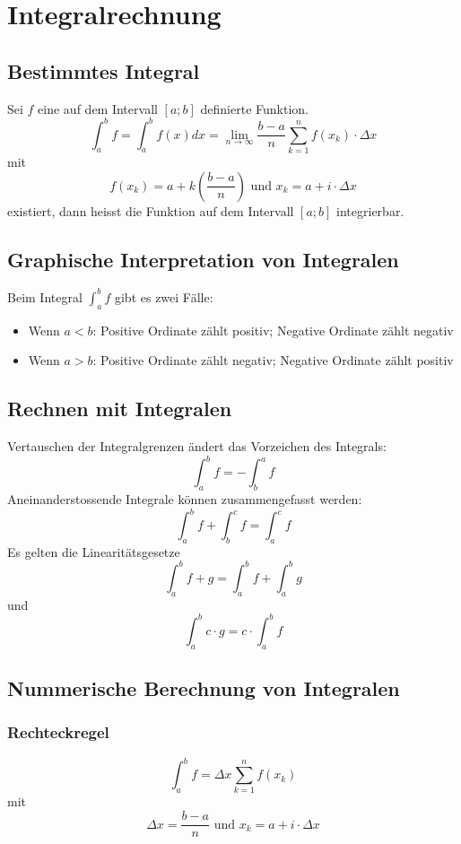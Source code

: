 \section{Integralrechnung}
\subsection{Bestimmtes Integral}
Sei $f$ eine auf dem Intervall $[a;b]$ definierte Funktion.
\[ \int^b_a f = \int^b _a f(x) dx =
  \lim_{n \to \infty} \frac{b-a}{n} \sum_{k=1}^{n}f(x_k) \cdot \Delta x
\]
mit
\[ f(x_k) = a + k\left(\frac{b-a}{n}\right) \text{ und }
  x_k = a + i \cdot \Delta x\]
existiert, dann heisst die Funktion auf dem Intervall $[a;b]$
integrierbar.

\subsection{Graphische Interpretation von Integralen}
Beim Integral $\int_{a}^{b}f$ gibt es zwei Fälle:
\begin{itemize}
  \item Wenn $a < b$: Positive Ordinate zählt positiv;
    Negative Ordinate zählt negativ
  \item Wenn $a > b$: Positive Ordinate zählt negativ;
    Negative Ordinate zählt positiv
\end{itemize}

\subsection{Rechnen mit Integralen}
Vertauschen der Integralgrenzen ändert das Vorzeichen des Integrals:
\[ \int_{a}^{b}f = - \int_{b}^{a}f \]
Aneinanderstossende Integrale können zusammengefasst werden:
\[ \int_{a}^{b}f + \int_{b}^{c}f = \int_{a}^{c}f \]
Es gelten die Linearitätsgesetze
\[ \int_{a}^{b}f+g = \int_{a}^{b}f + \int_{a}^{b}g \]
und
\[ \int_{a}^{b}c \cdot g = c \cdot \int_{a}^{b}f \]

\subsection{Nummerische Berechnung von Integralen}
\subsubsection{Rechteckregel}
\[ \int^b_a f =  \Delta x \sum_{k=1}^{n}f(x_k) \]
mit
\[ \Delta x = \frac{b-a}{n} \text{ und } x_k = a + i \cdot \Delta x \]

